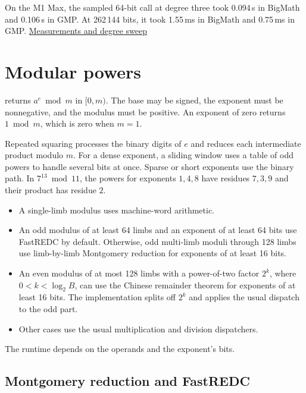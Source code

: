 \begin{perfnote}
On the M1 Max, the sampled 64-bit  call at degree three
took 0.094\,\textmu s in BigMath and 0.106\,\textmu s in GMP. At
262\,144 bits, it took 1.55\,ms in BigMath and 0.75\,ms in GMP.
\href{https://github.com/mmurshed/biginteger/blob/main/BENCHMARK.md\#integer-nth-root-and-remainder}{Measurements and degree sweep}
\end{perfnote}

\newpage
\section{Modular powers}
\label{sec:powmod}

 returns $a^e\bmod m$ in $[0,m)$.
The base may be signed, the exponent must be nonnegative, and the
modulus must be positive. An exponent of zero returns $1\bmod m$,
which is zero when $m=1$.

Repeated squaring processes the binary digits of $e$ and reduces each
intermediate product modulo $m$. For a dense exponent, a sliding window
uses a table of odd powers to handle several bits at once. Sparse or short
exponents use the binary path. In $7^{13}\bmod 11$, the powers for
exponents $1,4,8$ have residues $7,3,9$ and their product has residue $2$.

\begin{itemize}
  \item A single-limb modulus uses machine-word arithmetic.
  \item An odd modulus of at least 64 limbs and an exponent of at least
        64 bits use FastREDC by default. Otherwise, odd multi-limb moduli
        through 128 limbs use limb-by-limb Montgomery reduction for
        exponents of at least 16 bits.
  \item An even modulus of at most 128 limbs with a power-of-two factor
        $2^k$, where $0<k<\log_2 B$, can use the Chinese remainder
        theorem for exponents of at least 16 bits. The implementation
        splits off $2^k$ and applies the usual dispatch to the odd part.
  \item Other cases use the usual multiplication and division dispatchers.
\end{itemize}

The runtime depends on the operands and the exponent's bits.

\subsection{Montgomery reduction and FastREDC}
\label{sec:fastredc}

